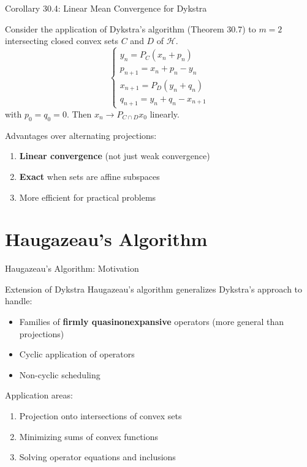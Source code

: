\documentclass[aspectratio=169,10pt]{beamer}
\begin{document}
\begin{frame}{Corollary 30.4: Linear Mean Convergence for Dykstra}
  \begin{corollary}
    Consider the application of Dykstra's algorithm (Theorem 30.7) to $m = 2$ intersecting closed convex sets $C$ and $D$ of $\mathcal{H}$.
    \[
      \begin{cases}
        y_n = P_C(x_n + p_n) \\
        p_{n+1} = x_n + p_n - y_n \\
        x_{n+1} = P_D(y_n + q_n) \\
        q_{n+1} = y_n + q_n - x_{n+1}
      \end{cases}
    \]
    with $p_0 = q_0 = 0$. Then $x_n \to P_{C \cap D} x_0$ linearly.
  \end{corollary}

  \vspace{0.3cm}

  Advantages over alternating projections:
  \begin{enumerate}
    \item \textbf{Linear convergence} (not just weak convergence)
    \item \textbf{Exact} when sets are affine subspaces
    \item More efficient for practical problems
  \end{enumerate}
\end{frame}

\section{Haugazeau's Algorithm}

\begin{frame}{Haugazeau's Algorithm: Motivation}
  \begin{block}{Extension of Dykstra}
    Haugazeau's algorithm generalizes Dykstra's approach to handle:
    \begin{itemize}
      \item Families of \textbf{firmly quasinonexpansive} operators (more general than projections)
      \item Cyclic application of operators
      \item Non-cyclic scheduling
    \end{itemize}
  \end{block}

  \vspace{0.3cm}

  Application areas:
  \begin{enumerate}
    \item Projection onto intersections of convex sets
    \item Minimizing sums of convex functions
    \item Solving operator equations and inclusions
  \end{enumerate}
\end{frame}
\end{document}
